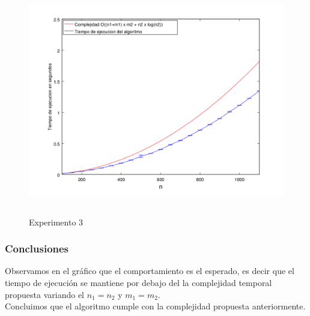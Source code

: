     \begin{figure}[H]
      \includegraphics[height=10cm]{graficos/ejercicio4-exp3.png}
       \caption{Experimento 3}
	\end{figure}
        
     	\subsubsection*{Conclusiones}\;
Observamos en el gráfico que el comportamiento es el esperado, es decir que el tiempo de ejecución se mantiene por debajo del la complejidad temporal propuesta variando el $n_1=n_2$ y $m_1=m_2$.\\
    Concluimos que el algoritmo cumple con la complejidad propuesta anteriormente.